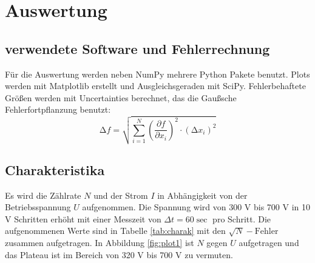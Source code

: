 \section{Auswertung}
\label{sec:Auswertung}

\subsection{verwendete Software und Fehlerrechnung}
\label{sec:SoftwareFehlerrechnung}

Für die Auswertung werden neben NumPy\cite{numpy} mehrere Python Pakete benutzt.
Plots werden mit Matplotlib\cite{matplotlib} erstellt und Ausgleichsgeraden mit SciPy\cite{scipy}.
Fehlerbehaftete Größen werden mit Uncertainties\cite{uncertainties} berechnet, das die Gaußsche Fehlerfortpflanzung benutzt:
\begin{equation*}
    \increment f = \sqrt{\sum_{i=1}^N \left( \frac{\partial f}{\partial x_i} \right)^{2} \cdot (\increment x_i)^{2}}
    \label{eqn:fehler}
\end{equation*}


\subsection{Charakteristika}
\label{sec:charak}

Es wird die Zählrate $N$ und der Strom $I$ in Abhängigkeit von der Betriebsspannung $U$ aufgenommen.
Die Spannung wird von 300 V bis 700 V in 10 V Schritten erhöht mit einer Messzeit von $\Delta t = 60 \si{\sec}$ pro Schritt.
Die aufgenommenen Werte sind in Tabelle \ref{tab:charak} mit den $\sqrt{N}-\text{Fehler}$ zusammen aufgetragen.
In Abbildung \ref{fig:plot1} ist $N$ gegen $U$ aufgetragen und das Plateau ist im Bereich von 320 V bis 700 V zu vermuten.

